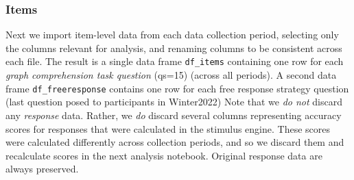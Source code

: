 \documentclass[
  letterpaper,
  DIV=11,
  numbers=noendperiod]{scrreprt}
\newenvironment{Shaded}{\begin{snugshade}}{\end{snugshade}}
\newcommand{\CommentTok}[1]{\textcolor[rgb]{0.37,0.37,0.37}{#1}}
\newcommand{\FunctionTok}[1]{\textcolor[rgb]{0.28,0.35,0.67}{#1}}
\newcommand{\NormalTok}[1]{\textcolor[rgb]{0.00,0.23,0.31}{#1}}
\newcommand{\OtherTok}[1]{\textcolor[rgb]{0.00,0.23,0.31}{#1}}
\newcommand{\SpecialCharTok}[1]{\textcolor[rgb]{0.37,0.37,0.37}{#1}}
\newcommand{\StringTok}[1]{\textcolor[rgb]{0.13,0.47,0.30}{#1}}
\begin{document}
\begin{Shaded}
\end{Shaded}

\hypertarget{items}{%
\subsubsection{Items}\label{items}}

Next we import item-level data from each data collection period,
selecting only the columns relevant for analysis, and renaming columns
to be consistent across each file. The result is a single data frame
\texttt{df\_items} containing one row for each \emph{graph comprehension
task question} (qs=15) (across all periods). A second data frame
\texttt{df\_freeresponse} contains one row for each free response
strategy question (last question posed to participants in Winter2022)
Note that we \emph{do not} discard any \emph{response} data. Rather, we
\emph{do} discard several columns representing accuracy scores for
responses that were calculated in the stimulus engine. These scores were
calculated differently across collection periods, and so we discard them
and recalculate scores in the next analysis notebook. Original response
data are always preserved.
\end{document}

